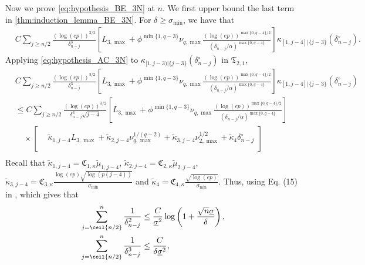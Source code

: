 \documentclass[aos]{imsart}
\begin{document}
\medskip
Now we prove \eqref{eq:hypothesis_BE_3N} at $n$. We first upper bound the last term in \cref{thm:induction_lemma_BE_3N}. For $\delta \geq \sigma_{\min}$, we have that
\begin{equation*}
\begin{aligned}
    & C \sum_{j \geq n/2} \frac{(\log(ep))^{3/2}}{\delta_{n-j}^3} \left[ 
        {L}_{3,\max} + \phi^{\min\{1, q-3\}} \nu_{q,\max} \frac{ {(\log(ep))}^{\max\{0, q-4\}/2}}{(\delta_{n-j}/\alpha)^{\max\{0, q-4\}}}
    \right]
    \kappa_{[1,j-4]|\{j-3\}}(\delta_{n-j}^\circ).
\end{aligned}
\end{equation*}
Applying \eqref{eq:hypothesis_AC_3N} to $\kappa_{[1,j-3)|\{j-3\}}(\delta_{n-j}^\circ)$ in $\mathfrak{T}_{2,1}$,
\begin{equation*}
\begin{aligned}
    & C \sum_{j \geq n/2} \frac{(\log(ep))^{3/2}}{\delta_{n-j}^3} 
    \left[ 
        {L}_{3,\max} + \phi^{\min\{1, q-3\}} \nu_{q,\max} \frac{ {(\log(ep))}^{\max\{0, q-4\}/2}}{(\delta_{n-j}/\alpha)^{\max\{0, q-4\}}}
    \right] 
    \kappa_{[1,j-4]|\{j-3\}}(\delta_{n-j}^\circ) \\
    & \leq C \sum_{j \geq n/2} 
    \frac{(\log(ep))^{3/2}}{\delta_{n-j}^3 \sqrt{j-4}} 
    \left[ 
        {L}_{3,\max} + \phi^{\min\{1, q-3\}} \nu_{q,\max} \frac{ {(\log(ep))}^{\max\{0, q-4\}/2}}{(\delta_{n-j}/\alpha)^{\max\{0, q-4\}}}
    \right] \\
    & \quad \times \left[ \begin{aligned}
        & \tilde\kappa_{1,j-4} {L}_{3,\max}
        + \tilde\kappa_{2,j-4} \nu_{q,\max}^{1/(q-2)}
        + \tilde\kappa_{3,j-4} \nu_{2,\max}^{1/2}
        + \tilde\kappa_{4} \delta_{n-j}^\circ \\
    \end{aligned} \right] \\
\end{aligned}
\end{equation*}
Recall that $\tilde\kappa_{1,j-4} = \mathfrak{C}_{1,\kappa} \tilde\mu_{1,j-4}$, 
$\tilde\kappa_{2,j-4} = \mathfrak{C}_{2,\kappa} \tilde\mu_{2,j-4}$, 
$\tilde\kappa_{3,j-4} = \mathfrak{C}_{3,\kappa} \frac{\log(ep)\sqrt{\log(p(j-4))}}{\sigma_{\min}}$ and 
$\tilde\kappa_{4} = \mathfrak{C}_{4,\kappa} \frac{\sqrt{\log(ep)}}{\sigma_{\min}}$. 
Thus, using Eq. (15) in , which gives that
\begin{equation} \label{eq:sum_delta_nolog}
\begin{aligned}
    \sum_{j=\ceil{n/2}}^{n} \frac{1}{\delta_{n-j}^2} 
    & \leq \frac{C}{\underline\sigma^2} \log\left(1 + \frac{\sqrt{n}\underline{\sigma}}{\delta}\right), \\
    \sum_{j=\ceil{n/2}}^{n} \frac{1}{\delta_{n-j}^3} 
    & \leq \frac{C}{\delta\underline\sigma^2},
\end{aligned}
\end{equation}
\end{document}
